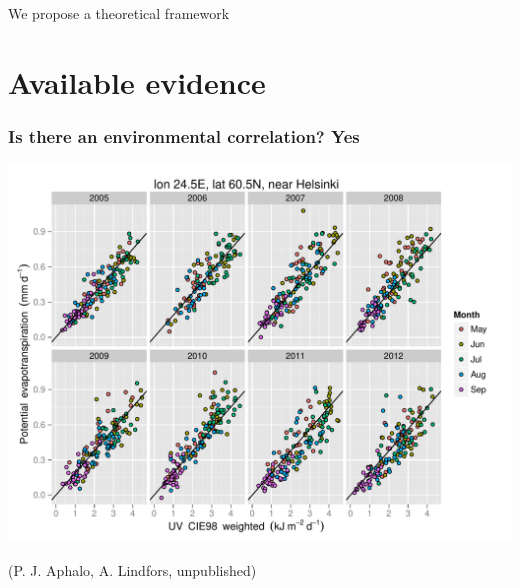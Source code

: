 \documentclass[10pt]{beamer}\usepackage[]{graphicx}\usepackage[]{color}
\begin{document}
\begin{frame}{We propose a theoretical framework}
\begin{itemize}
\end{itemize}
\end{frame}

\section{Available evidence}

\begin{frame}
  \frametitle{Is there an environmental correlation? Yes}
  \includegraphics[width=0.8\linewidth]{figures/PET-CIE.pdf}

  (P. J. Aphalo, A. Lindfors, unpublished)
\end{frame}
\end{document}
